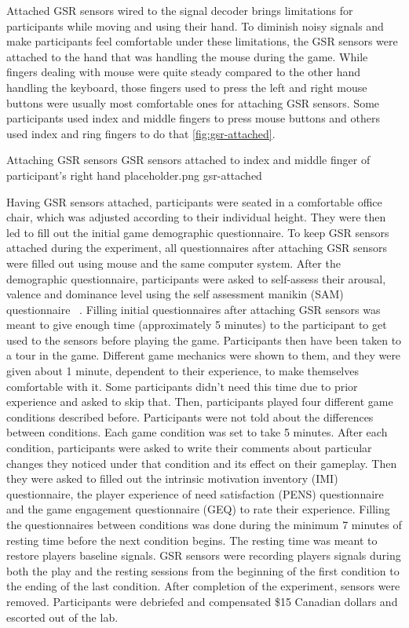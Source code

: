 \documentclass{uofsthesis-cs}
\begin{document}
Attached GSR sensors wired to the signal decoder brings limitations for participants while moving and using their hand. To diminish noisy signals and make participants feel comfortable under these limitations, the GSR sensors were attached to the hand that was handling the mouse during the game. While fingers dealing with mouse were quite steady compared to the other hand handling the keyboard, those fingers used to press the left and right mouse buttons were usually most comfortable ones for attaching GSR sensors. Some participants used index and middle fingers to press mouse buttons and others used index and ring fingers to do that \ref{fig:gsr-attached}.

\img
{Attaching GSR sensors}
{GSR sensors attached to index and middle finger of participant's right hand}
{placeholder.png}
{gsr-attached}

Having GSR sensors attached, participants were seated in a comfortable office chair, which was adjusted according to their individual height. They were then led to fill out the initial game demographic questionnaire. To keep GSR sensors attached during the experiment, all questionnaires after attaching GSR sensors were filled out using mouse and the same computer system. After the demographic questionnaire, participants were asked to self-assess their arousal, valence and dominance level using the self assessment manikin (SAM) questionnaire ~\cite{?}. Filling initial questionnaires after attaching GSR sensors was meant to give enough time (approximately 5 minutes) to the participant to get used to the sensors before playing the game. Participants then have been taken to a tour in the game. Different game mechanics were shown to them, and they were given about 1 minute, dependent to their experience, to make themselves comfortable with it. Some participants didn't need this time due to prior experience and asked to skip that. Then, participants played four different game conditions described before. Participants were not told about the differences between conditions. Each game condition was set to take 5 minutes. After each condition, participants were asked to write their comments about particular changes they noticed under that condition and its effect on their gameplay. Then they were asked to filled out the intrinsic motivation inventory (IMI) questionnaire, the player experience of need satisfaction (PENS) questionnaire and the game engagement questionnaire (GEQ) to rate their experience. Filling the questionnaires between conditions was done during the minimum 7 minutes of resting time before the next condition begins. The resting time was meant to restore players baseline signals. GSR sensors were recording players signals during both the play and the resting sessions from the beginning of the first condition to the ending of the last condition. After completion of the experiment, sensors were removed. Participants were debriefed and compensated \$15 Canadian dollars and escorted out of the lab.
\end{document}

